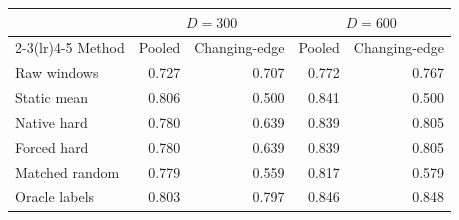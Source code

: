 \begin{tabular}{lrrrr}
\toprule
 & \multicolumn{2}{c}{$D=300$} & \multicolumn{2}{c}{$D=600$} \\
\cmidrule(lr){2-3}\cmidrule(lr){4-5}
Method & Pooled & Changing-edge & Pooled & Changing-edge \\
\midrule
Raw windows & 0.727 & 0.707 & 0.772 & 0.767 \\
Static mean & 0.806 & 0.500 & 0.841 & 0.500 \\
Native hard & 0.780 & 0.639 & 0.839 & 0.805 \\
Forced hard & 0.780 & 0.639 & 0.839 & 0.805 \\
Matched random & 0.779 & 0.559 & 0.817 & 0.579 \\
Oracle labels & 0.803 & 0.797 & 0.846 & 0.848 \\
\bottomrule
\end{tabular}
